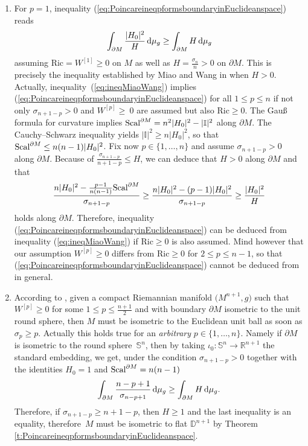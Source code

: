 \documentclass[pdftex]{sigma}
\numberwithin{equation}{section}
\begin{document}
\begin{Remarks}\quad \begin{enumerate}\itemsep=0pt
\item For $p=1$, inequality (\ref{eq:PoincareineqpformsboundaryinEuclideanspace}) reads
\begin{equation}\label{eq:ineqMiaoWang}
\int_{\partial M}\frac{|H_0|^2}{H}\,{\rm d}\mu_g\geq\int_{\partial M}H\,{\rm d}\mu_g
\end{equation}
assuming $\mathrm{Ric}=W^{[1]}\geq0$ on $M$ as well as $H=\frac{\sigma_n}{n}>0$ on $\partial M$. This is precisely the i\-ne\-qua\-li\-ty established by Miao and Wang in \cite[Theorem 1.2]{MiaoWang14} when $H>0$.
Actually, inequality~(\ref{eq:ineqMiaoWang})  implies (\ref{eq:PoincareineqpformsboundaryinEuclideanspace}) for all $1\leq p\leq n$ if not only $\sigma_{n+1-p}>0$ and $W^{[p]}\geq~0$ are assumed but also $\mathrm{Ric}\geq0$. The Gau\ss{} formula for curvature implies ${{\rm Scal}^{\partial M}=n^2|H_0|^2-|\mathbb{I}|^2}$ along $\partial M$. The  Cauchy--Schwarz i\-ne\-qua\-li\-ty yields $|\mathbb{I}|^2\geq n|H_0|^2$, so that ${\rm Scal}^{\partial M}\leq {n(n-1)|H_0|^2}$.
Fix now $p\in\{1,\dots,n\}$ and assume $\sigma_{n+1-p}>0$ along $\partial M$.
Because of $\frac{\sigma_{n+1-p}}{n+1-p}\leq H$, we can deduce that $H>0$ along $\partial M$ and that
\[\frac{n|H_0|^2-\frac{p-1}{n(n-1)}{\rm Scal}^{\partial M}}{\sigma_{n+1-p}}\geq\frac{n|H_0|^2-(p-1)|H_0|^2}{\sigma_{n+1-p}}\geq\frac{|H_0|^2}{H}\]
holds along $\partial M$.
Therefore, i\-ne\-qua\-li\-ty (\ref{eq:PoincareineqpformsboundaryinEuclideanspace}) can be deduced from i\-ne\-qua\-li\-ty (\ref{eq:ineqMiaoWang}) if $\mathrm{Ric}\geq0$ is also assumed. Mind however that our assumption $W^{[p]}\geq0$ differs from $\mathrm{Ric}\geq0$ for $2\leq p\leq n-1$, so that (\ref{eq:PoincareineqpformsboundaryinEuclideanspace}) cannot be deduced from \cite[Theorem~1.2]{MiaoWang14} in general.
\item According to \cite[Theorem 9]{RaulotSavo11}, given a compact Riemannian manifold $\bigl(M^{n+1},g\bigr)$ such that $W^{[p]}\geq 0$ for some $1\leq p\leq \frac{n+1}{2}$ and with boundary $\partial M$ isometric to the unit round sphere, then $M$ must be isometric to the Euclidean unit ball as soon as $\sigma_p\geq p$.
Actually this holds true for an \emph{arbitrary} $p\in\{1,\dots,n\}$. Namely if $\partial M$ is isometric to the round sphere~$\mathbb{S}^n$, then by taking $\iota_0\colon\mathbb{S}^n\to \mathbb{R}^{n+1}$ the standard embedding, we get, under the condition $\sigma_{n+1-p}>0$ together with the identities $H_0=1$ and ${\rm Scal}^{\partial M}=n(n-1)$
\[\int_{\partial M}\frac{n-p+1}{\sigma_{n-p+1}}\,{\rm d}\mu_g\geq \int_{\partial M}H\,{\rm d}\mu_g.\]
Therefore, if $\sigma_{n+1-p}\geq n+1-p$, then $H\geq1$ and the last i\-ne\-qua\-li\-ty is an equality, therefore~$M$ must be isometric to flat $\mathbb{D}^{n+1}$ by Theorem \ref{t:PoincareineqpformsboundaryinEuclideanspace}.
\end{enumerate}
\end{Remarks}
\end{document}
